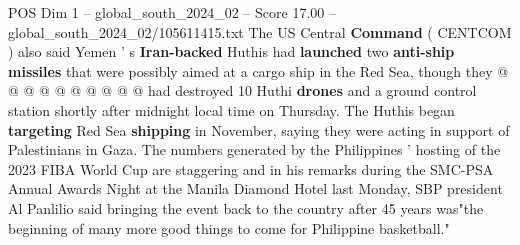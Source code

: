 \begin{textsample}{POS Dim 1 – global\_south\_2024\_02 – Score 17.00 – global\_south\_2024\_02/105611415.txt}
The US Central \textbf{Command} ( CENTCOM ) also said Yemen ' s \textbf{Iran-backed} Huthis had \textbf{launched} two \textbf{anti-ship} \textbf{missiles} that were possibly aimed at a cargo ship in the Red Sea, though they @ @ @ @ @ @ @ @ @ @ had destroyed 10 Huthi \textbf{drones} and a ground control station shortly after midnight local time on Thursday.
The Huthis began \textbf{targeting} Red Sea \textbf{shipping} in November, saying they were acting in support of Palestinians in Gaza.
The numbers generated by the Philippines ' hosting of the 2023 FIBA World Cup are staggering and in his remarks during the SMC-PSA Annual Awards Night at the Manila Diamond Hotel last Monday, SBP president Al Panlilio said bringing the event back to the country after 45 years was"the beginning of many more good things to come for Philippine basketball."

\end{textsample}

